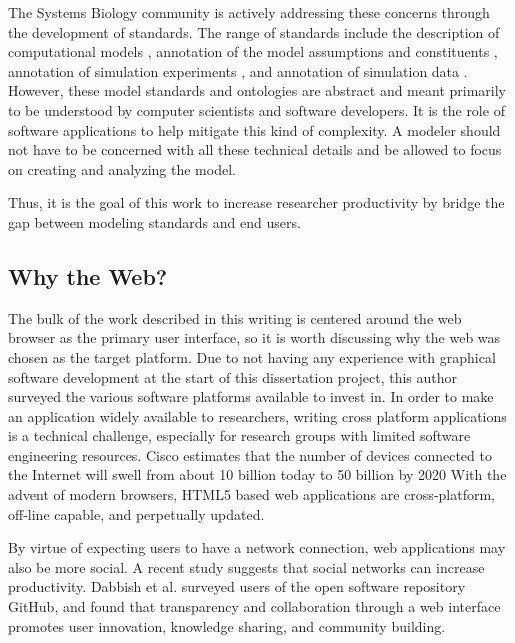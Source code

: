 The Systems Biology community is actively addressing these concerns through the development of standards.
The range of standards include the description of computational models \autocite{hucka:2002d, LloydCellML2004}, annotation of the model assumptions and constituents \autocite{novere2005minimum}, annotation of simulation experiments \autocite{kohn2008sed}, and annotation of simulation data \autocite{dada2010sbrml}.
However, these model standards and ontologies are abstract and meant primarily to be understood by computer scientists and software developers.
It is the role of software applications to help mitigate this kind of complexity.
A modeler should not have to be concerned with all these technical details and be allowed to focus on creating and analyzing the model.

Thus, it is the goal of this work to increase researcher productivity by bridge the gap between modeling standards and end users.

\subsection{Why the Web?}

The bulk of the work described in this writing is centered around the web browser as the primary user interface, so it is worth discussing why the web was chosen as the target platform.
Due to not having any experience with graphical software development at the start of this dissertation project, this author surveyed the various software platforms available to invest in.
In order to make an application widely available to researchers, writing cross platform applications is a technical challenge, especially for research groups with limited software engineering resources. \autocite{cusumano1999netscape}
Cisco estimates that the number of devices connected to the Internet will swell from about 10 billion today to 50 billion by 2020 \autocite{clark2014internet}
With the advent of modern browsers, HTML5 based web applications are cross-platform, off-line capable, and perpetually updated. \autocite{o2007web}

By virtue of expecting users to have a network connection, web applications may also be more social.
A recent study \autocite{dabbish2012social} suggests that social networks can increase productivity.
Dabbish et al. surveyed users of the open software repository GitHub, and found that transparency and collaboration through a web interface promotes user innovation, knowledge sharing, and community building.

